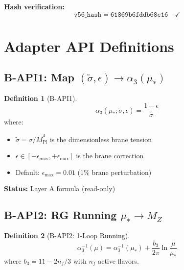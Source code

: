 \documentclass[11pt,a4paper]{article}
\theoremstyle{definition}
\newtheorem{definition}{Definition}[section]
\begin{document}
\textbf{Hash verification:}
\begin{equation}
\label{eq:v56-hash-verify}
\texttt{v56\_hash} = \texttt{61869b6fddb68c16} \quad \checkmark
\end{equation}

\begin{quarantinebox}
\end{quarantinebox}

\section{Adapter API Definitions}
\label{sec:api}

\subsection{B-API1: Map $(\tilde{\sigma}, \epsilon) \to \alpha_3(\mu_*)$}
\label{subsec:b-api1}

\begin{definition}[B-API1]
\label{def:b-api1}
\begin{equation}
\label{eq:b-api1}
\boxed{\alpha_3(\mu_*; \tilde{\sigma}, \epsilon) = \frac{1 - \epsilon}{\tilde{\sigma}}}
\end{equation}
where:
\begin{itemize}
  \item $\tilde{\sigma} = \sigma / \bar{M}_{\text{Pl}}^4$ is the dimensionless brane tension
  \item $\epsilon \in [-\epsilon_{\max}, +\epsilon_{\max}]$ is the brane correction
  \item Default: $\epsilon_{\max} = 0.01$ (1\% brane perturbation)
\end{itemize}
\end{definition}

\textbf{Status:} Layer A formula (read-only)

\subsection{B-API2: RG Running $\mu_* \to M_Z$}
\label{subsec:b-api2}

\begin{definition}[B-API2: 1-Loop Running]
\label{def:b-api2}
\begin{equation}
\label{eq:b-api2-1loop}
\boxed{\alpha_3^{-1}(\mu) = \alpha_3^{-1}(\mu_*) + \frac{b_3}{2\pi} \ln\frac{\mu}{\mu_*}}
\end{equation}
where $b_3 = 11 - 2n_f/3$ with $n_f$ active flavors.
\end{definition}
\end{document}
